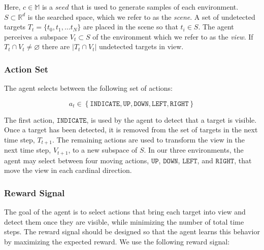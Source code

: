 Here, \(c \in \mathbb{M}\) is a \(seed\) that is used to generate samples of each environment.
\(S \subset \mathbb{R}^d\) is the searched space, which we refer to as the \textit{scene}.
A set of undetected targets \(T_t = \{t_0, t_1, \dots t_N\}\) are placed in the scene so that \(t_i \in S\).
The agent perceives a subspace \(V_t \subset S\) of the environment which we refer to as the \textit{view}.
If \(T_t \cap V_t \neq \varnothing\) there are \(\left\lvert T_t \cap V_t \right\rvert\) undetected targets in view.




\subsubsection{Action Set}

The agent selects between the following set of actions:

\begin{equation}
    a_t \in \left\lbrace \mathtt{INDICATE}, \mathtt{UP}, \mathtt{DOWN}, \mathtt{LEFT}, \mathtt{RIGHT} \right\rbrace
\end{equation}

The first action, \(\mathtt{INDICATE}\), is used by the agent to detect that a target is visible.
Once a target has been detected, it is removed from the set of targets in the next time step, \(T_{t+1}\).
The remaining actions are used to transform the view in the next time step, \(V_{t+1}\), to a new subspace of \(S\).
In our three environments, the agent may select between four moving actions, \(\mathtt{UP}\), \(\mathtt{DOWN}\), \(\mathtt{LEFT}\), and \(\mathtt{RIGHT}\), that move the view in each cardinal direction.

\subsubsection{Reward Signal}

The goal of the agent is to select actions that bring each target into view and detect them once they are visible, while minimizing the number of total time steps.
The reward signal should be designed so that the agent learns this behavior by maximizing the expected reward.
We use the following reward signal:

